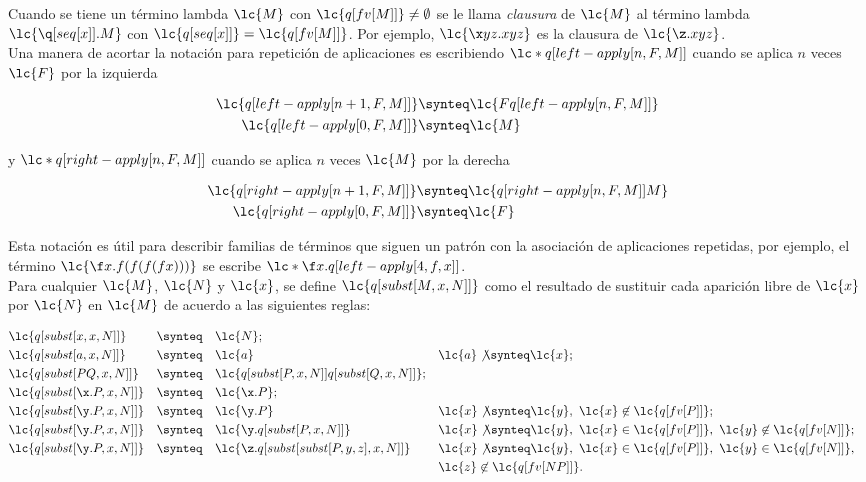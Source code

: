 Cuando se tiene un término lambda \(\lc{M}\) con \(\lc{q[fv[M]]} \not=
\emptyset\) se le llama \emph{clausura} de \(\lc{M}\) al término lambda
\(\lc{\q[seq[x]].M}\) con \(\lc{q[seq[x]]}=\lc{q[fv[M]]}\). Por ejemplo,
\(\lc{\x y z.x y z}\) es la clausura de \(\lc{\z.x y z}\). \\

Una manera de acortar la notación para repetición de aplicaciones es escribiendo
\(\lc*{q[left-apply[n,F,M]]}\) cuando se aplica \(n\) veces \(\lc{F}\) por la
izquierda

\begin{align*}
  \lc{q[left-apply[n+1,F,M]]} &\synteq \lc{F q[left-apply[n,F,M]]}\\
  \lc{q[left-apply[0,F,M]]}   &\synteq \lc{M}
\end{align*}

y \(\lc*{q[right-apply[n,F,M]]}\) cuando se aplica \(n\) veces \(\lc{M}\) por la
derecha

\begin{align*}
  \lc{q[right-apply[n+1,F,M]]} &\synteq \lc{q[right-apply[n,F,M]] M}\\
  \lc{q[right-apply[0,F,M]]}   &\synteq \lc{F}
\end{align*}

Esta notación es útil para describir familias de términos que siguen un patrón
con la asociación de aplicaciones repetidas, por ejemplo, el término \(\lc{\f
  x.f(f(f(f x)))}\) se escribe \(\lc*{\f x.q[left-apply[4,f,x]]}\). \\

Para cualquier \(\lc{M}\), \(\lc{N}\) y \(\lc{x}\), se define
\(\lc{q[subst[M,x,N]]}\) como el resultado de sustituir cada aparición libre de
\(\lc{x}\) por \(\lc{N}\) en \(\lc{M}\) de acuerdo a las siguientes reglas:

\begin{align*}
  &\lc{q[subst[x,x,N]]} & &\synteq & &\lc{N}; \\
  &\lc{q[subst[a,x,N]]} & &\synteq & &\lc{a} & &\lc{a} \not\synteq \lc{x}; \\
  &\lc{q[subst[P Q,x,N]]} & &\synteq & &\lc{q[subst[P,x,N]] q[subst[Q,x,N]]}; \\
  &\lc{q[subst[\x.P,x,N]]} & &\synteq & &\lc{\x.P}; \\
  &\lc{q[subst[\y.P,x,N]]} & &\synteq & &\lc{\y.P} & &\lc{x}\not\synteq \lc{y},\ \lc{x} \not\in \lc{q[fv[P]]}; \\
  &\lc{q[subst[\y.P,x,N]]} & &\synteq & &\lc{\y.q[subst[P,x,N]]} & &\lc{x}\not\synteq \lc{y},\ \lc{x}\in\lc{q[fv[P]]},\ \lc{y}\not\in \lc{q[fv[N]]}; \\
  &\lc{q[subst[\y.P,x,N]]} & &\synteq & &\lc{\z.q[subst[subst[P,y,z],x,N]]} & &\lc{x}\not\synteq \lc{y},\ \lc{x}\in\lc{q[fv[P]]},\ \lc{y}\in \lc{q[fv[N]]}, \\
  & & & & & & & \lc{z}\not\in \lc{q[fv[N P]]}.
\end{align*}

